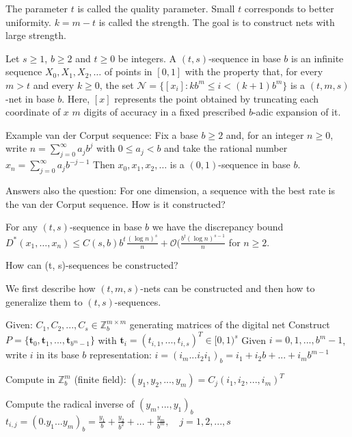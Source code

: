 The parameter \( t \) is called the quality parameter. Small \( t \) corresponds to better uniformity.
\( k = m - t \) is called the strength. The goal is to construct nets with large strength.

Let \( s \geq 1 \), \( b \geq 2 \) and \( t \geq 0 \) be integers. A \( (t,s) \)-sequence in base \( b \) is an infinite
sequence \( X_0, X_1, X_2, \dots \) of points in \( [0,1] \) with the property that, for every \( m > t \)
and every \( k \geq 0 \), the set
\( \mathcal{N} = \{ [x_i] : kb^m \le i < (k+1)b^m \} \)
is a \( (t, m, s) \)-net in base \( b \).  Here, \( [x] \) represents the point obtained by truncating
each coordinate of \( x \) \( m \) digits of accuracy in a fixed prescribed \(b\)-adic expansion
of it.

Example van der Corput sequence: Fix a base \( b \geq 2 \) and, for an integer \( n \geq 0\), write
\( n = \sum_{j=0}^\infty a_j b^j \) with \( 0 \leq a_j < b \) and take the rational number \( x_n = \sum_{j=0}^\infty a_j b^{-j-1} \)
Then \( x_0, x_1, x_2, \dots \) is a \((0,1)\)-sequence in base \( b \).

Answers also the question:
For one dimension, a sequence with the best rate is the van der Corput sequence.
How is it constructed?

For any \( (t, s) \)-sequence in base \( b \) we have the discrepancy bound
\( D^\ast(x_1, \dots, x_n) \leq C(s,b)b^t \frac{(\log n)^s}{n} + \mathcal{O}(\frac{b^t(\log n)^{s-1}}{n} \)
for \( n \geq 2 \).

How can (t, s)-sequences be constructed?

We first describe how \( (t, m, s) \)-nets can be constructed and then how to generalize
them to \( (t,s) \)-sequences.

Given: \( C_1, C_2, ..., C_s \in \mathbb{Z}_b^{m \times m} \) generating matrices of the digital net
Construct \( P = \{\mathbf{t}_0, \mathbf{t}_1, ..., \mathbf{t}_{b^m - 1}\} \) with \( \mathbf{t}_i = (t_{i,1}, ..., t_{i,s})^T \in [0,1)^s \)
Given \(i = 0, 1, ..., b^m - 1\), write \( i \) in its base \( b \) representation:
\( i = (i_m ... i_2 i_1)_b = i_1 + i_2 b + ... + i_m b^{m-1} \)

Compute in \( \mathbb{Z}_b^m \) (finite field):
\( (y_1, y_2, ..., y_m) = C_j (i_1, i_2, ..., i_m)^T \)

Compute the radical inverse of \( (y_m, ..., y_1)_b \)
\( t_{i,j} = (0.y_1 ... y_m)_b = \frac{y_1}{b} + \frac{y_2}{b^2} + ... + \frac{y_m}{b^m}, \quad j = 1, 2, ..., s \)

